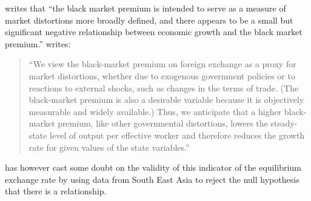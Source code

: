 \documentclass{article}\usepackage{graphicx, color}
\makeatletter
\newenvironment{kframe}{%
 \def\at@end@of@kframe{}%
 \ifinner\ifhmode%
  \def\at@end@of@kframe{\end{minipage}}%
  \begin{minipage}{\columnwidth}%
 \fi\fi%
 \def\FrameCommand##1{\hskip\@totalleftmargin \hskip-\fboxsep
 \colorbox{shadecolor}{##1}\hskip-\fboxsep
     \hskip-\linewidth \hskip-\@totalleftmargin \hskip\columnwidth}%
 \MakeFramed {\advance\hsize-\width
   \@totalleftmargin\z@ \linewidth\hsize
   \@setminipage}}%
 {\par\unskip\endMakeFramed%
 \at@end@of@kframe}
\newenvironment{knitrout}{}{} %
\makeatother
\begin{document}
\citet{barnett1999inflation} writes that ``the black market premium
is intended to serve as a measure of market distortions more broadly
defined, and there appears to be a small but significant negative
relationship between economic growth and the black market premium.''
\citet[p. 13]{barro1994sources} writes:
\begin{quote}
``We view the black-market premium on foreign exchange as a proxy
for market distortions, whether due to exogenous government policies
or to reactions to external shocks, such as changes in the terms of
trade. (The black-market premium is also a desirable variable because
it is objectively measurable and widely available.) Thus, we anticipate
that a higher black-market premium, like other governmental distortions,
lowers the steady-state level of output per effective worker and therefore
reduces the growth rate for given values of the state variables.''
\end{quote}
\citet{emran2004isblack} has however cast some doubt on the validity
of this indicator of the equilibrium exchange rate by using data from
South East Asia to reject the null hypothesis that there is a relationship.

\begin{knitrout}
\color{fgcolor}\begin{kframe}


{\ttfamily\noindent\color{warningcolor}{\#\# Warning: NaNs produced}}\end{kframe}
\end{knitrout}
\end{document}
